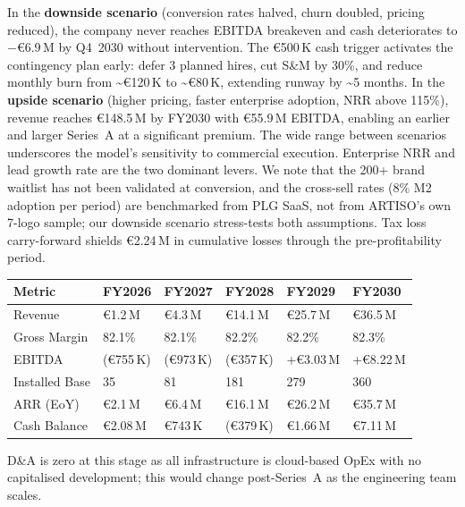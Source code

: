 \documentclass[11pt,a4paper]{article}
\begin{document}
In the \textbf{downside scenario} (conversion rates halved, churn doubled, pricing reduced), the company never reaches EBITDA breakeven and cash deteriorates to $-$\euro{}6.9\,M by Q4~2030 without intervention. The \euro{}500\,K cash trigger activates the contingency plan early: defer 3 planned hires, cut S\&M by 30\%, and reduce monthly burn from \textasciitilde\euro{}120\,K to \textasciitilde\euro{}80\,K, extending runway by \textasciitilde5 months. In the \textbf{upside scenario} (higher pricing, faster enterprise adoption, NRR above 115\%), revenue reaches \euro{}148.5\,M by FY2030 with \euro{}55.9\,M EBITDA, enabling an earlier and larger Series~A at a significant premium. The wide range between scenarios underscores the model's sensitivity to commercial execution. Enterprise NRR and lead growth rate are the two dominant levers. We note that the 200+ brand waitlist has not been validated at conversion, and the cross-sell rates (8\% M2 adoption per period) are benchmarked from PLG SaaS, not from ARTISO's own 7-logo sample; our downside scenario stress-tests both assumptions. Tax loss carry-forward shields \euro{}2.24\,M in cumulative losses through the pre-profitability period.

\vspace{-2pt}
\begin{table}[h!]
\centering
\scriptsize
\begin{tabularx}{\textwidth}{p{2.4cm}XXXXX}
\toprule
\textbf{Metric} & \textbf{FY2026} & \textbf{FY2027} & \textbf{FY2028} & \textbf{FY2029} & \textbf{FY2030} \\
\midrule
Revenue & \euro{}1.2\,M & \euro{}4.3\,M & \euro{}14.1\,M & \euro{}25.7\,M & \euro{}36.5\,M \\
Gross Margin & 82.1\% & 82.1\% & 82.2\% & 82.2\% & 82.3\% \\
EBITDA & (\euro{}755\,K) & (\euro{}973\,K) & (\euro{}357\,K) & +\euro{}3.03\,M & +\euro{}8.22\,M \\
Installed Base & 35 & 81 & 181 & 279 & 360 \\
ARR (EoY) & \euro{}2.1\,M & \euro{}6.4\,M & \euro{}16.1\,M & \euro{}26.2\,M & \euro{}35.7\,M \\
Cash Balance & \euro{}2.08\,M & \euro{}743\,K & (\euro{}379\,K) & \euro{}1.66\,M & \euro{}7.11\,M \\
\bottomrule
\end{tabularx}
\end{table}
\vspace{-4pt}

D\&A is zero at this stage as all infrastructure is cloud-based OpEx with no capitalised development; this would change post-Series~A as the engineering team scales.
\end{document}

